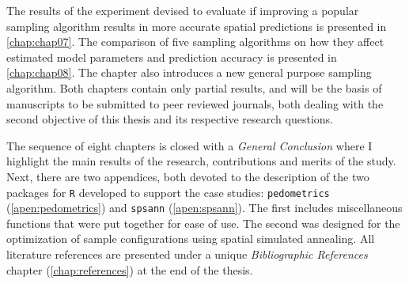 The results of the experiment devised to evaluate if improving a popular sampling algorithm results in more 
accurate spatial predictions is presented in \autoref{chap:chap07}. The comparison of five sampling algorithms 
on how they affect estimated model parameters and prediction accuracy is presented in \autoref{chap:chap08}. 
The chapter also introduces a new general purpose sampling algorithm. Both chapters contain only partial 
results, and will be the basis of manuscripts to be submitted to peer reviewed journals, both dealing with the 
second objective of this thesis and its respective research questions.

The sequence of eight chapters is closed with a \emph{General Conclusion} where I highlight the main results 
of the research, contributions and merits of the study. Next, there are two appendices, both devoted to the 
description of the two packages for \texttt{R} developed to support the case studies: \texttt{pedometrics} 
(\autoref{apen:pedometrics}) and \texttt{spsann} (\autoref{apen:spsann}). The first includes miscellaneous 
functions that were put together for ease of use. The second was designed for the optimization of sample 
configurations using spatial simulated annealing. All literature references are presented under a unique 
\emph{Bibliographic References} chapter (\autoref{chap:references}) at the end of the thesis.
